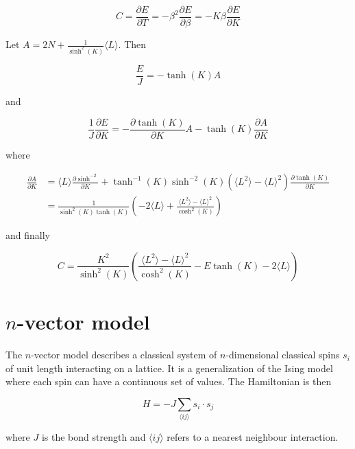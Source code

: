 \begin{equation}
    C = \frac{\partial E}{\partial T} = - \beta^2 \frac{\partial E}{\partial \beta} = -K \beta \frac{\partial E}{\partial K}
\end{equation}

Let $A = 2N + \frac{1}{\sinh^2(K)} \langle L \rangle$. Then

\begin{equation}
    \frac{E}{J} = - \tanh(K) A
\end{equation}

and

\begin{equation}
    \frac{1}{J} \frac{\partial E}{\partial K} = - \frac{\partial \tanh(K)}{\partial K} A - \tanh(K) \frac{\partial A}{\partial K}
\end{equation}

where

\begin{align*}
    \frac{\partial A}{\partial K} &= \langle L \rangle \frac{\partial \sinh^{-2}}{\partial K} + \tanh^{-1}(K)\sinh^{-2}(K) \left ( \langle L^2 \rangle - \langle L \rangle^2 \right ) \frac{\partial \tanh(K)}{\partial K} \\
    &= \frac{1}{\sinh^2(K) \tanh(K)} \left (-2 \langle L \rangle + \frac{\langle L^2 \rangle - \langle L \rangle^2}{\cosh^2(K)} \right )
\end{align*}

and finally

\begin{equation}
    C = \frac{K^2}{\sinh^2(K)} \left ( \frac{\langle L^2 \rangle - \langle L \rangle^2}{\cosh^2(K)} - E \tanh(K) - 2 \langle L \rangle \right )
\end{equation}

\section{$n$-vector model}
\label{sec:nVector}

The $n$-vector model describes a classical system of $n$-dimensional classical spins $s_i$ of unit length interacting on a lattice. It is a generalization of the Ising model where each spin can have a continuous set of values. The Hamiltonian is then

\begin{equation}
    H = -J\sum_{\langle ij \rangle} s_i \cdot s_j
\end{equation}

where $J$ is the bond strength and $\langle ij \rangle$ refers to a nearest neighbour interaction.

